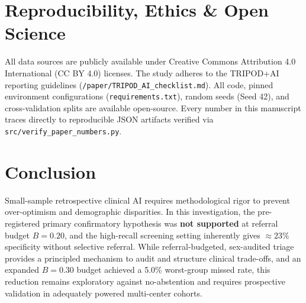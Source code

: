 \documentclass[11pt,a4paper]{article}
\begin{document}
\section{Reproducibility, Ethics \& Open Science}
All data sources are publicly available under Creative Commons Attribution 4.0 International (CC BY 4.0) licenses. The study adheres to the TRIPOD+AI reporting guidelines (\texttt{/paper/TRIPOD\_AI\_checklist.md}). All code, pinned environment configurations (\texttt{requirements.txt}), random seeds (Seed 42), and cross-validation splits are available open-source. Every number in this manuscript traces directly to reproducible JSON artifacts verified via \texttt{src/verify\_paper\_numbers.py}.

\section{Conclusion}
Small-sample retrospective clinical AI requires methodological rigor to prevent over-optimism and demographic disparities. In this investigation, the pre-registered primary confirmatory hypothesis was \textbf{not supported} at referral budget $B=0.20$, and the high-recall screening setting inherently gives $\approx 23\%$ specificity without selective referral. While referral-budgeted, sex-audited triage provides a principled mechanism to audit and structure clinical trade-offs, and an expanded $B=0.30$ budget achieved a 5.0\% worst-group missed rate, this reduction remains exploratory against no-abstention and requires prospective validation in adequately powered multi-center cohorts.



\end{document}
